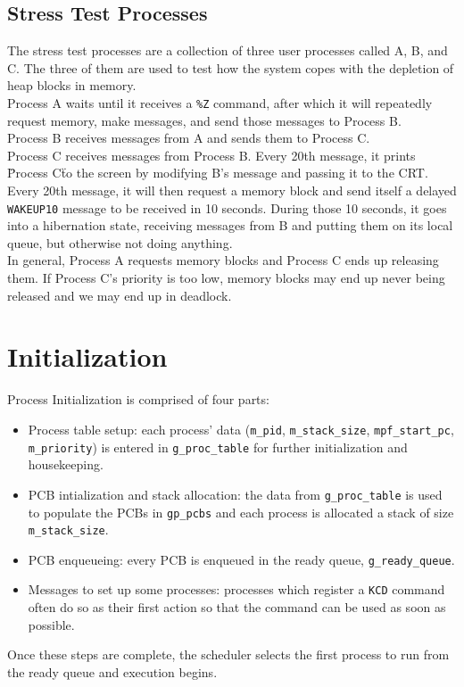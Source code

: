 \documentclass[12pt]{report}
\begin{document}
\subsection{Stress Test Processes}

The stress test processes are a collection of three user processes called A, B, and C. The three of them are used to test how the system copes with the depletion of heap blocks in memory.\\

Process A waits until it receives a {\tt \%Z} command, after which it will repeatedly request memory, make messages, and send those messages to Process B.\\

Process B receives messages from A and sends them to Process C.\\

Process C receives messages from Process B. Every 20th message, it prints \"Process C\" to the screen by modifying B's message and passing it to the CRT. Every 20th message, it will then request a memory block and send itself a delayed {\tt WAKEUP10} message to be received in 10 seconds. During those 10 seconds, it goes into a hibernation state, receiving messages from B and putting them on its local queue, but otherwise not doing anything.\\

In general, Process A requests memory blocks and Process C ends up releasing them. If Process C's priority is too low, memory blocks may end up never being released and we may end up in deadlock.\\

\section{Initialization}

Process Initialization is comprised of four parts:
\begin{itemize}
	\item Process table setup: each process' data (\texttt{m_pid}, \texttt{m_stack_size},
		\texttt{mpf_start_pc}, \texttt{m_priority}) is entered in \texttt{g_proc_table}
		for further initialization and housekeeping.
	\item PCB intialization and stack allocation: the data from \texttt{g_proc_table}
		is used to populate the PCBs in \texttt{gp_pcbs} and each process is
		allocated a stack of size \texttt{m_stack_size}.
	\item PCB enqueueing: every PCB is enqueued in the ready queue, \texttt{g_ready_queue}.
	\item Messages to set up some processes: processes which register a \texttt{KCD}
		command often do so as their first action so that the command can be
		used as soon as possible.
\end{itemize}
Once these steps are complete, the scheduler selects the first process to run
from the ready queue and execution begins.
\end{document}
